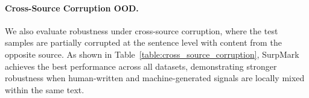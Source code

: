 \documentclass{article}
\theoremstyle{plain}
\theoremstyle{definition}
\theoremstyle{remark}
\begin{document}







\vspace{-2mm}
\paragraph{Cross-Source Corruption OOD.}
We also evaluate robustness under cross-source corruption, where the test samples are partially corrupted at the sentence level with content from the opposite source. 
As shown in Table~\ref{table:cross_source_corruption}, SurpMark achieves the best performance across all datasets,  demonstrating stronger robustness when human-written and machine-generated signals are locally mixed within the same text.
\end{document}
